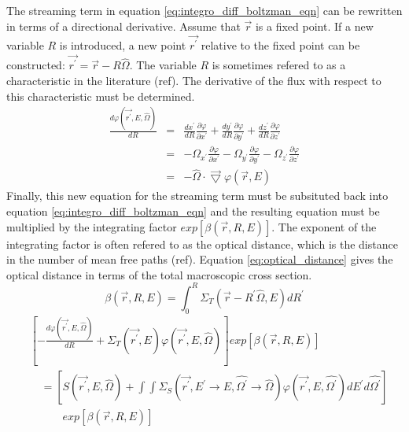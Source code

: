 The streaming term in equation \ref{eq:integro_diff_boltzman_eqn} can be 
rewritten in terms of a directional derivative. Assume that $\vec{r}$ is a 
fixed point. If a new variable $R$ is introduced, a
new point $\vec{r^{'}}$ relative to the fixed point can be constructed: 
$\vec{r^{'}} = \vec{r} - R\hat{\Omega}$. The variable $R$ is sometimes refered
to as a characteristic in the literature (ref). The derivative of the flux
with respect to this characteristic must be determined.
\begin{eqnarray*}
  \frac{d\varphi(\vec{r^{'}},E,\hat{\Omega})}{dR} & = & \frac{dx^{'}}{dR}
  \frac{\partial\varphi}{\partial x^{'}} + \frac{dy^{'}}{dR} 
  \frac{\partial\varphi}{\partial y^{'}} + \frac{dz^{'}}{dR}
  \frac{\partial\varphi}{\partial z^{'}} \nonumber \\
  & = & -\Omega_{x^{'}}\frac{\partial\varphi}{\partial x^{'}} -
  \Omega_{y^{'}}\frac{\partial\varphi}{\partial y^{'}} -
  \Omega_{z^{'}}\frac{\partial\varphi}{\partial z^{'}} \nonumber \\
  & = & -\hat{\Omega} \cdot 
  \vec{\bigtriangledown}\varphi(\vec{r},E) \nonumber
\end{eqnarray*}
Finally, this new equation for the streaming term must be subsituted back into
equation \ref{eq:integro_diff_boltzman_eqn} and the resulting equation must be
multiplied by the integrating factor $exp\left[\beta(\vec{r},R,E)\right]$. 
The exponent of the integrating factor is often refered to as the optical 
distance, which is the distance in the number of mean free paths (ref). 
Equation \ref{eq:optical_distance} gives the optical distance in terms of the 
total macroscopic cross section.
\begin{equation}
  \beta(\vec{r},R,E) = \int_0^R \Sigma_T(\vec{r}-R^{'}\hat{\Omega},E)dR^{'}
  \label{eq:optical_distance}
\end{equation}
\begin{equation*}
  \begin{split}
    &\left[-\frac{d\varphi(\vec{r^{'}},E,\hat{\Omega})}{dR}
    + \Sigma_T(\vec{r^{'}},E)\varphi(\vec{r^{'}},E,\hat{\Omega}) \right]
    exp\left[\beta(\vec{r},R,E)\right] \\
    & \quad = \left[S(\vec{r^{'}},E,\hat{\Omega}) + \int\int 
      \Sigma_S(\vec{r^{'}},E^{'} \to E,\hat{\Omega^{'}} \to \hat{\Omega})
      \varphi(\vec{r^{'}},E,\hat{\Omega^{'}}) dE^{'}d\hat{\Omega^{'}}\right] \\
    & \quad\quad\quad
    exp\left[\beta(\vec{r},R,E)\right] 
  \end{split}
\end{equation*}
